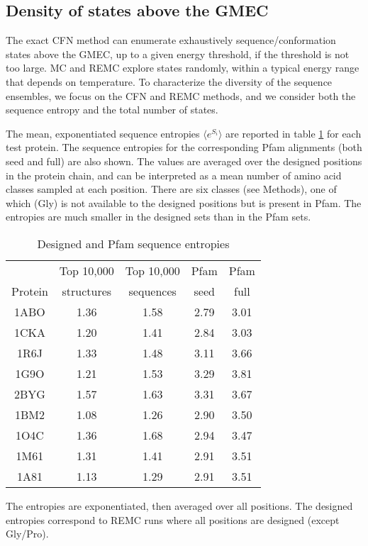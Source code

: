 \subsection{Density of states above the GMEC}
The exact CFN method can enumerate exhaustively sequence/conformation states above the GMEC, up to a given energy threshold, if the threshold is not too large. MC and REMC explore states randomly, within a typical energy range that depends on temperature. To characterize the diversity of the sequence ensembles, we focus on the CFN and REMC methods, and we consider both the sequence entropy and the total number of states. 

The mean, exponentiated sequence entropies $\langle e^{S_i}\rangle$ are reported in table \ref{tab:entropy} for each test protein. The sequence entropies for the corresponding Pfam alignments (both seed and full) are also shown. The values are averaged over the designed positions in the protein chain, and can be interpreted as a mean number of amino acid classes sampled at each position. There are six classes (see Methods), one of which (Gly) is not available to the designed positions but is present in Pfam. The entropies are much smaller in the designed sets than in the Pfam sets.


\begin{table}[!htbp]                            
\caption{Designed and Pfam sequence entropies}
\label{tab:entropy}                      
\begin{center}
\begin{tabular}{ccccc} \hline \hline  
        & Top 10,000 & Top 10,000 & Pfam & Pfam \\
Protein & structures & sequences  & seed & full \\ \hline
1ABO & 1.36 & 1.58 & 2.79 & 3.01 \\
1CKA & 1.20 & 1.41 & 2.84 & 3.03 \\
1R6J & 1.33 & 1.48 & 3.11 & 3.66 \\
1G9O & 1.21 & 1.53 & 3.29 & 3.81 \\
2BYG & 1.57 & 1.63 & 3.31 & 3.67 \\
1BM2 & 1.08 & 1.26 & 2.90 & 3.50 \\
1O4C & 1.36 & 1.68 & 2.94 & 3.47 \\
1M61 & 1.31 & 1.41 & 2.91 & 3.51 \\
1A81 & 1.13 & 1.29 & 2.91 & 3.51 \\ \hline
\end{tabular}
\end{center}
{\small \noindent The entropies are exponentiated, then averaged over all positions.
The designed entropies correspond to REMC runs where all positions are designed (except Gly/Pro).}
\end{table}


